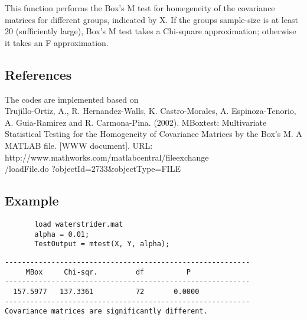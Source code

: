\documentclass[a4paper,11pt,openany]{memoir}
\begin{document}
\begin{par}
This function performs the Box's M test for homegeneity of the covariance matrices for different groups, indicated by X. If the groups sample-size is at least 20 (sufficiently large), Box's M test takes a Chi-square approximation; otherwise it takes an F approximation.
\end{par} \vspace{1em}


\subsection*{References}

\begin{par}
The codes are implemented based on\\ 
Trujillo-Ortiz, A., R. Hernandez-Walls, K. Castro-Morales, A. Espinoza-Tenorio, A. Guia-Ramirez and R. Carmona-Pina. (2002). MBoxtest: Multivariate Statistical Testing for the Homogeneity of Covariance Matrices by the Box's M. A MATLAB file. [WWW document]. URL: \\
http://www.mathworks.com/matlabcentral/fileexchange\\
/loadFile.do
?objectId=2733\&objectType=FILE
\end{par} \vspace{1em}


\subsection*{Example}


\begin{verbatim}       load waterstrider.mat
       alpha = 0.01;
       TestOutput = mtest(X, Y, alpha);\end{verbatim}
    
        \color{lightgray} \begin{verbatim} 
----------------------------------------------------------
     MBox     Chi-sqr.         df          P
----------------------------------------------------------
  157.5977   137.3361          72       0.0000
----------------------------------------------------------
Covariance matrices are significantly different.
\end{verbatim} \color{black}
    
\end{document}
